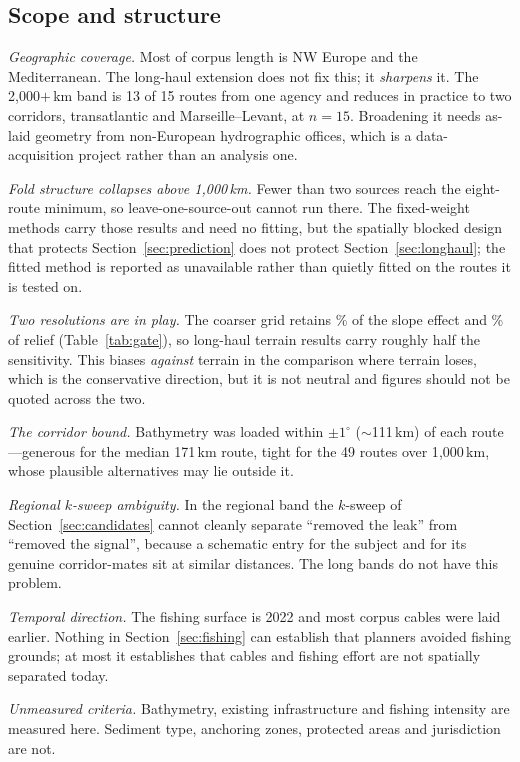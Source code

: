 \documentclass[journal]{IEEEtran}
\begin{document}
\subsection{Scope and structure}\label{sec:scope}
\emph{Geographic coverage.} Most of corpus length is NW Europe and the
Mediterranean. The long-haul extension does not fix this; it \emph{sharpens}
it. The 2{,}000$+$\,km band is 13 of 15 routes from one agency and reduces in
practice to two corridors, transatlantic and Marseille--Levant, at $n=15$.
Broadening it needs as-laid geometry from non-European hydrographic offices,
which is a data-acquisition project rather than an analysis one.

\emph{Fold structure collapses above 1{,}000\,km.} Fewer than two sources reach
the eight-route minimum, so leave-one-source-out cannot run there. The
fixed-weight methods carry those results and need no fitting, but the spatially
blocked design that protects Section~\ref{sec:prediction} does not protect
Section~\ref{sec:longhaul}; the fitted method is reported as unavailable rather
than quietly fitted on the routes it is tested on.

\emph{Two resolutions are in play.} The coarser grid retains \nGateSlope\% of
the slope effect and \nGateRelief\% of relief (Table~\ref{tab:gate}), so
long-haul terrain results carry roughly half the sensitivity. This biases
\emph{against} terrain in the comparison where terrain loses, which is the
conservative direction, but it is not neutral and figures should not be quoted
across the two.

\emph{The corridor bound.} Bathymetry was loaded within $\pm 1^\circ$
($\sim$111\,km) of each route---generous for the median 171\,km route, tight
for the 49 routes over 1{,}000\,km, whose plausible alternatives may lie
outside it.

\emph{Regional $k$-sweep ambiguity.} In the regional band the $k$-sweep of
Section~\ref{sec:candidates} cannot cleanly separate ``removed the leak'' from
``removed the signal'', because a schematic entry for the subject and for its
genuine corridor-mates sit at similar distances. The long bands do not have
this problem.

\emph{Temporal direction.} The fishing surface is 2022 and most corpus cables
were laid earlier. Nothing in Section~\ref{sec:fishing} can establish that
planners avoided fishing grounds; at most it establishes that cables and
fishing effort are not spatially separated today.

\emph{Unmeasured criteria.} Bathymetry, existing infrastructure and fishing
intensity are measured here. Sediment type, anchoring zones, protected areas
and jurisdiction are not.
\end{document}

